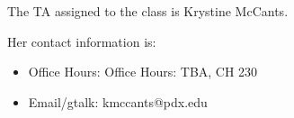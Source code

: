 The TA assigned to the class is Krystine McCants. 

Her contact information is:
\begin{itemize}
 \item Office Hours: Office Hours: TBA, CH 230
 \item Email/gtalk: kmccants@pdx.edu
\end{itemize}
